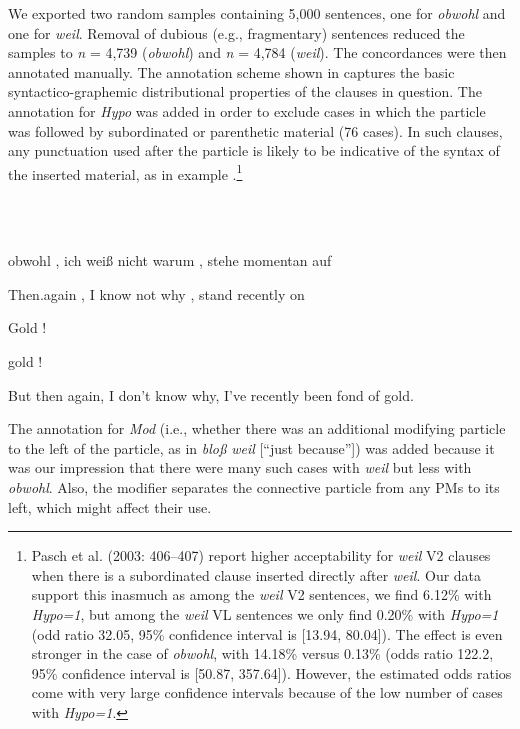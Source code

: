 We exported two random samples containing 5,000 sentences, one for \textit{obwohl} and one for \textit{weil}. Removal of dubious (e.g., fragmentary) sentences reduced the samples to \textit{n} = 4,739 (\textit{obwohl}) and \textit{n} = 4,784 (\textit{weil}). The concordances were then annotated manually. The annotation scheme shown in  captures the basic syntactico-graphemic distribu\-tional properties of the clauses in question. The annotation for \textit{Hypo} was added in order to exclude cases in which the particle was followed by subordinated or parenthetic material (76 cases). In such clauses, any punctuation used after the particle is likely to be indicative of the syntax of the inserted material, as in example .\footnote{Pasch et al. (2003: 406–407) report higher acceptability for \textit{weil} V2 clauses when there is a subordinated clause inserted directly after \textit{weil}. Our data support this inasmuch as among the \textit{weil} V2 sentences, we find 6.12\% with \textit{Hypo=1}, but among the \textit{weil} VL sentences we only find 0.20\% with \textit{Hypo=1} (odd ratio 32.05, 95\% confidence interval is [13.94, 80.04]). The effect is even stronger in the case of \textit{obwohl}, with 14.18\% versus 0.13\% (odds ratio 122.2, 95\% confidence interval is [50.87, 357.64]). However, the estimated odds ratios come with very large confidence intervals because of the low number of cases with \textit{Hypo=1}.}



\ea%
    \label{ex:key:10}
    \gll\\
        \\
    \glt
    \z

          obwohl  ,  ich  weiß  nicht  warum  ,  stehe  momentan  auf



Then.again  ,  I  know  not  why    ,  stand  recently  on



Gold  !



gold  !



But then again, I don’t know why, I’ve recently been fond of gold.



The annotation for \textit{Mod} (i.e., whether there was an additional modifying particle to the left of the particle, as in \textit{bloß} \textit{weil} [“just because”]) was added because it was our impression that there were many such cases with \textit{weil} but less with \textit{obwohl}. Also, the modifier separates the connective particle from any PMs to its left, which might affect their use.



